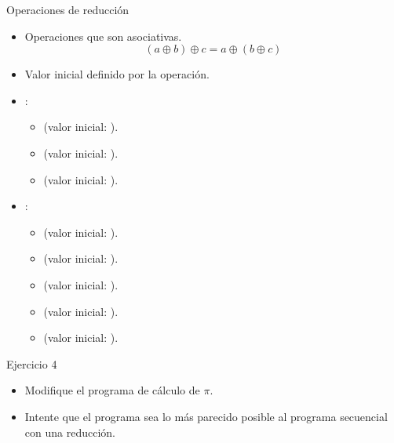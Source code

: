 \begin{frame}[t]{Operaciones de reducción}
\begin{itemize}
  \item Operaciones que son asociativas.
\[
(a \oplus b) \oplus c = a \oplus (b \oplus c)
\]

  \item Valor inicial definido por la operación.

  \item {}:
    \begin{itemize}
      \item \cppkey{+} (valor inicial: ).
      \item \cppkey{*} (valor inicial: ).
      \item \cppkey{-} (valor inicial: ).
    \end{itemize}

  \item {}:
    \begin{itemize}
      \item \cppkey{\&} (valor inicial: ).
      \item \cppkey{|} (valor inicial: ).
      \item \cppkey{\^} (valor inicial: ).
      \item \cppkey{\&\&} (valor inicial: ).
      \item \cppkey{||} (valor inicial: ).
    \end{itemize}

\end{itemize}
\end{frame}

\begin{frame}[t]{Ejercicio 4}
\begin{itemize}
  \item Modifique el programa de cálculo de $\pi$.
  \item Intente que el programa sea lo más parecido posible al programa secuencial
        con una reducción.
\end{itemize}
\end{frame}
